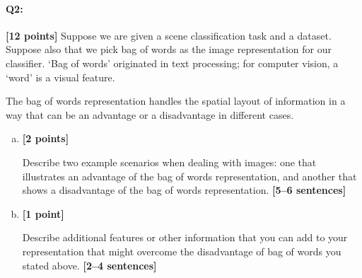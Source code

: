 \pagebreak
\paragraph{Q2:} \textbf{[12 points]} Suppose we are given a scene classification task and a dataset. Suppose also that we pick bag of words as the image representation for our classifier. `Bag of words' originated in text processing; for computer vision, a `word' is a visual feature.

The bag of words representation handles the spatial layout of information in a way that can be an advantage or a disadvantage in different cases.

\begin{enumerate}[(a)]

\item \textbf{[2 points]} 
\begin{tcolorbox}[colback=orange!5!white,colframe=orange!75!black]
     Describe two example scenarios when dealing with images: one that illustrates an advantage of the bag of words representation, and another that shows a disadvantage of the bag of words representation. \textbf{[5--6 sentences]}
\end{tcolorbox}


\item \textbf{[1 point]}
\begin{tcolorbox}[colback=orange!5!white,colframe=orange!75!black]
      Describe additional features or other information that you can add to your representation that might overcome the disadvantage of bag of words you stated above. \textbf{[2--4 sentences]}
\end{tcolorbox}


\end{enumerate}

